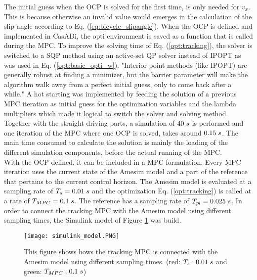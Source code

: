 The initial guess when the OCP is solved for the first time, is only needed for $v_x$. This is because otherwise an invalid value would emerges in the calculation of the slip angle according to Eq. (\ref{eq:bicycle_slipangle}). When the OCP is defined and implemented in CasADi, the opti environment is saved as a function that is called during the MPC. To improve the solving time of Eq. (\ref{opt:tracking}), the solver is switched to a SQP method using an active-set QP solver instead of IPOPT as was used in Eq. (\ref{opt:basic_opti_w}). "Interior point methods (like IPOPT) are generally robust at finding a minimizer, but the barrier parameter will make the algorithm walk away from a perfect initial guess, only to come back after a while." \cite{Gillis2019} A hot starting was implemented by feeding the solution of a previous MPC iteration as initial guess for the optimization variables and the lambda multipliers which made it logical to switch the solver and solving method. Together with the straight driving parts, a simulation of $40\hspace{1mm}s$ is performed and one iteration of the MPC where one OCP is solved, takes around $0.15\hspace{1mm}s$. The main time consumed to calculate the solution is mainly the loading of the different simulation components, before the actual running of the MPC.\\

With the OCP defined, it can be included in a MPC formulation. Every MPC iteration uses the current state of the Amesim model and a part of the reference that pertains to the current control horizon. The Amesim model is evaluated at a sampling rate of $T_s = 0.01 \hspace{1mm}s$ and the optimization Eq. (\ref{opt:tracking}) is called at a rate of $T_{MPC} = 0.1 \hspace{1mm}s$. The reference has a sampling rate of $T_{pl} = 0.025\hspace{1mm}s$. In order to connect the tracking MPC with the Amesim model using different sampling times, the Simulink model of Figure \ref{fig:simulink_model} was build. \\

\begin{figure}[h!]
	\centering
	\texttt{[image: simulink\_model.PNG]}
	\caption{This figure shows hows the tracking MPC is connected with the Amesim model using different sampling times. (red: $T_s: 0.01\hspace{1mm}s$ and green: $T_{MPC}:0.1\hspace{1mm}s$)}	
	\label{fig:simulink_model}
\end{figure}

